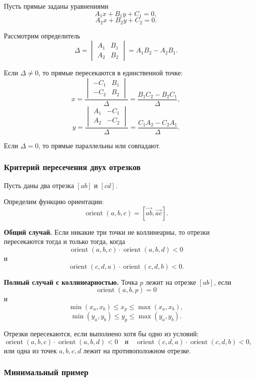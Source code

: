 \documentclass[12pt,a4paper]{article}
\begin{document}
Пусть прямые заданы уравнениями
\[
A_1x+B_1y+C_1=0,
\]
\[
A_2x+B_2y+C_2=0.
\]

Рассмотрим определитель
\[
\Delta =
\begin{vmatrix}
A_1 & B_1\\
A_2 & B_2
\end{vmatrix}
=
A_1B_2-A_2B_1.
\]

Если \(\Delta\neq 0\), то прямые пересекаются в единственной точке:
\[
x=
\frac{
\begin{vmatrix}
-C_1 & B_1\\
-C_2 & B_2
\end{vmatrix}
}{\Delta}
=
\frac{B_1C_2-B_2C_1}{\Delta},
\]
\[
y=
\frac{
\begin{vmatrix}
A_1 & -C_1\\
A_2 & -C_2
\end{vmatrix}
}{\Delta}
=
\frac{C_1A_2-C_2A_1}{\Delta}.
\]

Если \(\Delta=0\), то прямые параллельны или совпадают.

\subsubsection{Критерий пересечения двух отрезков}

Пусть даны два отрезка \([ab]\) и \([cd]\).

Определим функцию ориентации:
\[
\operatorname{orient}(a,b,c)
=
[\overrightarrow{ab},\overrightarrow{ac}].
\]

\textbf{Общий случай.}
Если никакие три точки не коллинеарны, то отрезки пересекаются тогда и только тогда, когда
\[
\operatorname{orient}(a,b,c)\cdot \operatorname{orient}(a,b,d)<0
\]
и
\[
\operatorname{orient}(c,d,a)\cdot \operatorname{orient}(c,d,b)<0.
\]

\textbf{Полный случай с коллинеарностью.}
Точка \(p\) лежит на отрезке \([ab]\), если
\[
\operatorname{orient}(a,b,p)=0
\]
и
\[
\min(x_a,x_b)\le x_p\le \max(x_a,x_b),
\]
\[
\min(y_a,y_b)\le y_p\le \max(y_a,y_b).
\]

Отрезки пересекаются, если выполнено хотя бы одно из условий:
\[
\operatorname{orient}(a,b,c)\cdot \operatorname{orient}(a,b,d)<0
\quad\text{и}\quad
\operatorname{orient}(c,d,a)\cdot \operatorname{orient}(c,d,b)<0,
\]
или одна из точек \(a,b,c,d\) лежит на противоположном отрезке.

\subsubsection{Минимальный пример}
\end{document}
